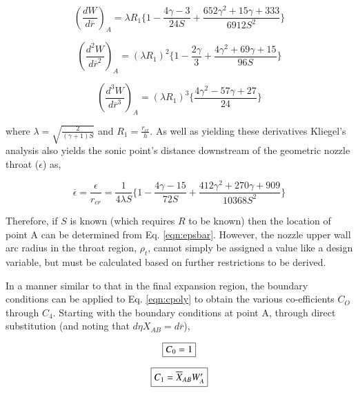 \begin{equation}
	(\frac{dW}{d\overline{r}})_A = \lambda R_1\Big\{1 - \frac{4\gamma-3}{24S} + \frac{652\gamma^2 
	+ 15\gamma + 333}{6912S^2}\Big\}
\label{eqn:waprime}
\end{equation}	

\begin{equation}
	(\frac{d^2W}{d\overline{r}^2})_A = (\lambda R_1)^2\Big\{1 - \frac{2\gamma}{3} + \frac{4\gamma^2 
	+ 69\gamma + 15}{96S}\Big\}
\label{eqn:wadprime}
\end{equation}

\begin{equation}
	(\frac{d^3W}{d\overline{r}^3})_A = (\lambda R_1)^3\Big\{\frac{4\gamma^2 - 57\gamma + 27}{24}\Big\}
\label{eqn:watprime}
\end{equation}	

	where $\lambda = \sqrt{\frac{2}{(\gamma+1)S}}$ and $R_1 = \frac{r_{cr}}{h}$.  
As well as yielding these derivatives Kliegel's analysis also yields the sonic point's distance 
downstream of the geometric nozzle throat ($\epsilon$) as,

\begin{equation}
	\overline{\epsilon}=\frac{\epsilon}{r_{cr}}=\frac{1}{4\lambda S}\Big\{1 - \frac{4\gamma -15}
	{72S} + \frac{412\gamma^2 + 270\gamma + 909}{10368S^2}\Big\}
\label{eqn:epsbar}
\end{equation}

	Therefore, if $S$ is known (which requires $R$ to be known) then the location of point
A can be determined from Eq. \ref{eqn:epsbar}.  However, the nozzle upper wall arc radius in the
throat region, $\rho_t$, cannot simply be assigned a value like a design variable, but must
be calculated based on further restrictions to be derived.  

	In a manner similar to that in the final expansion region, the boundary conditions can be 
applied to Eq. \ref{eqn:cpoly} to obtain the various co-efficients $C_O$ through $C_4$.  Starting with 
the boundary conditions at point A, through direct substitution (and noting that 
$d\eta X_{AB} = d\overline{r}$),

\begin{equation}
	\fbox{$
	C_0 = 1
	$}
\label{eqn:c0}
\end{equation}

\begin{equation}
	\fbox{$
	C_1 = \overline{X}_{AB}W'_A
	$}
\label{eqn:c1}
\end{equation}

